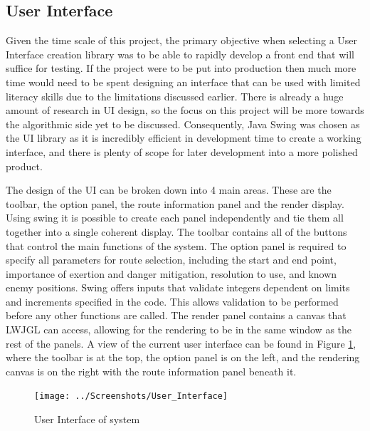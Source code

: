 \documentclass[12pt,a4paper]{article}
\begin{document}
  \subsection{User Interface}
  \noindent Given the time scale of this project, the primary objective when selecting a User Interface creation library was to be able to rapidly develop a front end that will suffice for testing. If the project were to be put into production then much more time would need to be spent designing an interface that can be used with limited literacy skills due to the limitations discussed earlier. There is already a huge amount of research in UI design, so the focus on this project will be more towards the algorithmic side yet to be discussed. Consequently, Java Swing was chosen as the UI library as it is incredibly efficient in development time to create a working interface, and there is plenty of scope for later development into a more polished product.
  \par The design of the UI can be broken down into 4 main areas. These are the toolbar, the option panel, the route information panel and the render display. Using swing it is possible to create each panel independently and tie them all together into a single coherent display. The toolbar contains all of the buttons that control the main functions of the system. The option panel is required to specify all parameters for route selection, including the start and end point, importance of exertion and danger mitigation, resolution to use, and known enemy positions. Swing offers inputs that validate integers dependent on limits and increments specified in the code. This allows validation to be performed before any other functions are called. The render panel contains a canvas that LWJGL can access, allowing for the rendering to be in the same window as the rest of the panels. A view of the current user interface can be found in Figure \ref{user_interface}, where the toolbar is at the top, the option panel is on the left, and the rendering canvas is on the right with the route information panel beneath it.

  \begin{figure}[htb]
    \centering
    \texttt{[image: ../Screenshots/User\_Interface]}
    \caption{User Interface of system}
    \label{user_interface}
  \end{figure}
\end{document}

